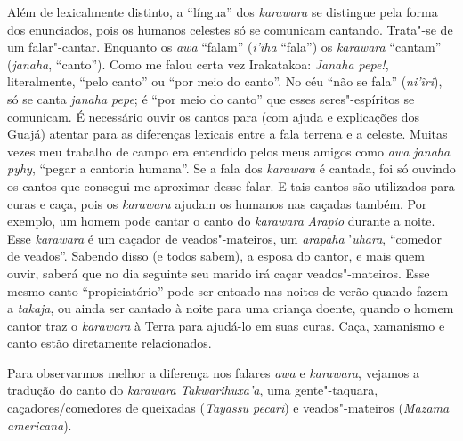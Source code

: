 Além de lexicalmente distinto, a ``língua'' dos \emph{karawara} se
distingue pela forma dos enunciados, pois os humanos celestes só se
comunicam cantando. Trata"-se de um falar"-cantar. Enquanto os \emph{awa}
``falam'' (\emph{i'ĩha} ``fala'') os \emph{karawara} ``cantam''
(\emph{janaha}, ``canto''). Como me falou certa vez Irakatakoa:
\emph{Janaha pepe!}, literalmente, ``pelo canto'' ou ``por meio do
canto''. No céu ``não se fala'' (\emph{ni'ĩri}), só se canta
\emph{janaha pepe}; é ``por meio do canto'' que esses seres"-espíritos se
comunicam. É necessário ouvir os cantos para (com ajuda e explicações
dos Guajá) atentar para as diferenças lexicais entre a fala terrena e a
celeste. Muitas vezes meu trabalho de campo era entendido pelos meus
amigos como \emph{awa janaha pyhy}, ``pegar a cantoria humana''. Se a fala
dos \emph{karawara} é cantada, foi só ouvindo os cantos que consegui me
aproximar desse falar. E tais cantos são utilizados para curas e caça,
pois os \emph{karawara} ajudam os humanos nas caçadas também. Por
exemplo, um homem pode cantar o canto do \emph{karawara} \emph{Arapio}
durante a noite. Esse \emph{karawara} é um caçador de veados"-mateiros,
um \emph{arapaha} '\emph{uhara}, ``comedor de veados''. Sabendo disso (e
todos sabem), a esposa do cantor, e mais quem ouvir, saberá que no dia
seguinte seu marido irá caçar veados"-mateiros. Esse mesmo canto
``propiciatório'' pode ser entoado nas noites de verão quando fazem a
\emph{takaja}, ou ainda ser cantado à noite para uma criança doente,
quando o homem cantor traz o \emph{karawara} à Terra para ajudá-lo em
suas curas. Caça, xamanismo e canto estão diretamente relacionados.

Para observarmos melhor a diferença nos falares \emph{awa} e
\emph{karawara}, vejamos a tradução do canto do \emph{karawara}
\emph{Takwarihuxa'a}, uma gente"-taquara, caçadores/comedores de
queixadas (\emph{Tayassu pecari}) e veados"-mateiros (\emph{Mazama
americana}).

